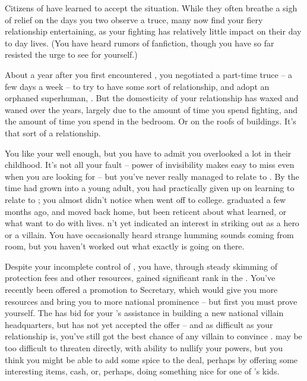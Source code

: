 \documentclass[char]{LRSguildcamp1}
\begin{document}
Citizens of \pCityO{} have learned to accept the situation. While they often breathe a sigh of relief on the days you two observe a truce, many now find your fiery relationship entertaining, as your fighting has relatively little impact on their day to day lives.  (You have heard rumors of fanfiction, though you have so far resisted the urge to see for yourself.)

About a year after you first encountered \cOS{}, you negotiated a part-time truce -- a few days a week -- to try to have some sort of relationship, and adopt an orphaned superhuman, \cGrad{}.  
But the domesticity of your relationship has waxed and waned over the years, largely due to the amount of time you spend fighting, and the amount of time you spend in the bedroom.  
Or on the roofs of buildings.  
It's that sort of a relationship.  

You like your \cGrad{\offspring} well enough, but you have to admit you overlooked \cGrad{\them} a lot in their childhood.  
It's not all your fault -- \cGrad{\their} power of invisibility makes \cGrad{\them} easy to miss even when you are looking for \cGrad{\them} -- but you've never really managed to relate to \cGrad{\them}.  
By the time \cGrad{\they} had grown into a young adult, you had practically given up on learning to relate to \cGrad{\them}; you almost didn't notice when \cGrad{} went off to college.  
\cGrad{\They} graduated a few months ago, and moved back home, but \cGrad{\have} been reticent about what \cGrad{\they} learned, or what \cGrad{\they} want to do with \cGrad{\their} lives.  \cGrad{\They} \cGrad{\have}n't yet indicated an interest in striking out as a hero or a villain.  
You have occasionally heard strange humming sounds coming from \cGrad{\their} room, but you haven't worked out what exactly is going on there. %

Despite your incomplete control of \pCityO{}, you have, through steady skimming of protection fees and other resources, gained significant rank in the \cVillainCompact{\intro}.  You've recently been offered a promotion to Secretary, which would give you more resources and bring you to more national prominence -- but first you must prove yourself.  The \cVillainCompact{} has bid for your \cArchitect{\sibling} \cArchitect{}'s assistance in building a new national villain headquarters, but \cArchitect{} has not yet accepted the offer -- and as difficult as your relationship is, you've still got the best chance of any villain to convince \cArchitect{\them}.  \cArchitect{} may be too difficult to threaten directly, with \cArchitect{\their} ability to nullify your powers, but you think you might be able to add some spice to the deal, perhaps by offering some interesting items, cash, or, perhaps, doing something nice for one of \cArchitect{}'s kids.  
\end{document}

